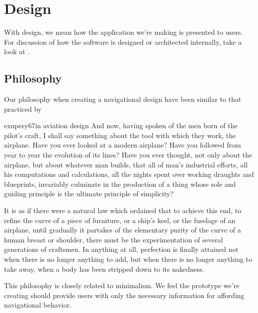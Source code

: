 \section{Design}
\label{section:implementation.design}

With design, we mean how the application we're making is
presented to users. For discussion of how the software is designed
or architected internally, take a look at
.

\subsection{Philosophy}

Our philosophy when creating a navigational design have been
similar to that practiced by
\begin{fullquotation}[\chap{3}]{exupery67}{in aviation design}
  \noindent
  And now, having spoken of the men born of the pilot's craft, I shall say
  something about the tool with which they work, the airplane. Have you
  ever looked at a modern airplane? Have you followed from year to year
  the evolution of its lines? Have you ever thought, not only about the
  airplane, but about whatever man builds, that all of man's industrial
  efforts, all his computations and calculations, all the nights spent
  over working draughts and blueprints, invariably culminate in the
  production of a thing whose sole and guiding principle is the ultimate
  principle of simplicity?

  It is as if there were a natural law which ordained that to achieve this
  end, to refine the curve of a piece of furniture, or a ship's keel, or
  the fuselage of an airplane, until gradually it partakes of the
  elementary purity of the curve of a human breast or shoulder, there must
  be the experimentation of several generations of craftsmen. In anything
  at all, perfection is finally attained not when there is no longer
  anything to add, but when there is no longer anything to take away,
  when a body has been stripped down to its nakedness.
\end{fullquotation}

This philosophy is closely related to minimalism.%
We feel the prototype we're creating should provide users
with only the necessary information for affording navigational behavior.

